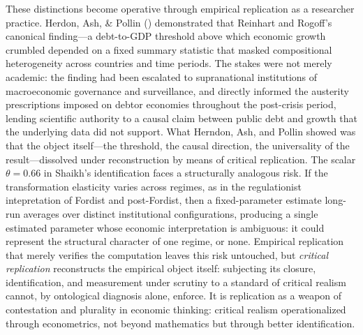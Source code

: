 These distinctions become operative through empirical replication as a researcher practice. Herdon, Ash, \& Pollin (\citeyear{HAP2014}) demonstrated that Reinhart and Rogoff's canonical finding---a debt-to-GDP threshold above which economic growth crumbled depended on a fixed summary statistic that masked compositional heterogeneity across countries and time periods. The stakes were not merely academic: the finding had been escalated to supranational institutions of macroeconomic governance and surveillance, and directly informed the austerity prescriptions imposed on debtor economies throughout the post-crisis period, lending scientific authority to a causal claim between public debt and growth that the underlying data did not support. What Herndon, Ash, and Pollin showed was that the object itself---the threshold, the causal direction, the universality of the result---dissolved under reconstruction by means of critical replication. The scalar $\theta = 0.66$ in Shaikh's identification faces a structurally analogous risk. If the transformation elasticity varies across regimes, as in the regulationist intepretation of Fordist and post-Fordist, then a fixed-parameter estimate long-run averages over distinct institutional configurations, producing a single estimated parameter whose economic interpretation is ambiguous: it could represent the structural character of one regime, or none. Empirical replication that merely verifies the computation leaves this risk untouched, but \textit{critical replication} reconstructs the empirical object itself: subjecting its closure, identification, and measurement under scrutiny to a standard of critical realism cannot, by ontological diagnosis alone, enforce. It is replication as a weapon of contestation and plurality in economic thinking: critical realism operationalized through econometrics, not beyond mathematics but through better identification.

